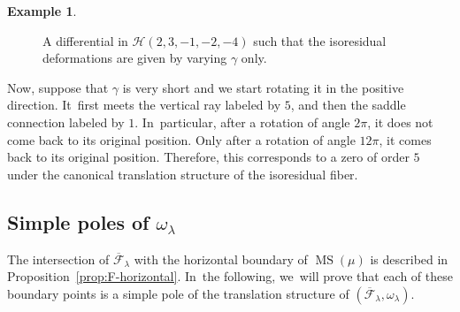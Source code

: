 \documentclass[11pt]{article}
\DeclareMathOperator\MS{MS}
\theoremstyle{definition}
\newtheorem{ex}[thm]{Example}
\begin{document}
\begin{ex}
\begin{figure}[ht]
\caption{A differential in $\mathcal{H}(2,3,-1,-2,-4)$ such that the isoresidual deformations are given by varying $\gamma$ only.} \label{fig:isores1}
\end{figure}
Now, suppose that $\gamma$ is very short and we start rotating it in the positive direction. It~first meets the vertical ray labeled by $5$, and then the saddle connection labeled by $1$. In~particular, after a rotation of angle $2\pi$, it does not come back to its original position. Only after a rotation of angle $12\pi$, it comes back to its original position. Therefore, this corresponds to a zero of order $5$ under the canonical translation structure of the isoresidual fiber.
\end{ex}

\subsection{Simple poles of $\omega_{\lambda}$}\label{subsub:SimplePoles}

The intersection of $\overline{\mathcal{F}}_{\lambda}$ with the horizontal boundary of $\MS(\mu)$ is described in Proposition~\ref{prop:F-horizontal}. In~the following, we~will prove that each of these boundary points is a simple pole of the translation structure of $(\overline{\mathcal{F}}_{\lambda},\omega_{\lambda})$.
\end{document}
